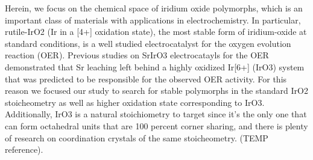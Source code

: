 

Herein, we focus on the chemical space of iridium oxide polymorphs,
which is an important class of materials with applications in electrochemistry. In particular, rutile-IrO2 (Ir in a [4+] oxidation state), the most stable form of iridium-oxide at standard conditions, is a well studied electrocatalyst for the oxygen evolution reaction (OER).
Previous studies on SrIrO3 electrocatayls for the OER demonstrated that Sr leaching left behind a highly oxidized Ir[6+] (IrO3) system that was predicted to be responsible for the observed OER activity.
%
For this reason we focused our study to search for stable polymorphs in the standard IrO2 stoicheometry as well as higher oxidation state corresponding to IrO3.
Additionally, IrO3 is a natural stoichiometry to target since it's the only one that can form octahedral units that are 100 percent corner sharing, and there is plenty of research on coordination crystals of the same stoicheometry. (TEMP reference).




